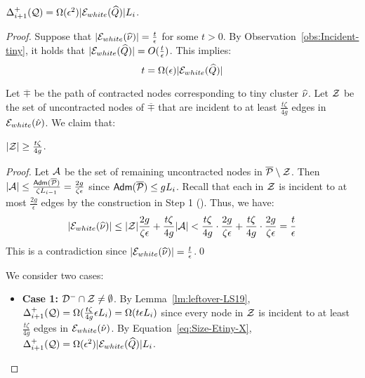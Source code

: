 \begin{lemma}\label{lm:H5}
	$\Delta^+_{i+1}(\mathcal{Q}) = \Omega(\epsilon^2)|\mathcal{E}_{white}(\widehat{Q})|L_i$.
\end{lemma}
\begin{proof}
	Suppose that $|\mathcal{E}_{white}(\widehat{\nu})| = \frac{t}{\epsilon}$ for some $t > 0$. By Observation~\ref{obs:Incident-tiny}, it holds that $|\mathcal{E}_{white}(\widehat{Q})| = O( \frac{t}{\epsilon})$. This implies:
	\begin{equation}\label{eq:Size-Etiny-X}
		t = \Omega(\epsilon)|\mathcal{E}_{white}(\widehat{Q})|
	\end{equation}
	
	Let $\overline{\mp}$ be the path of contracted nodes corresponding to tiny cluster $\widehat{\nu}$. Let $\mathcal{Z}$ be the set of uncontracted nodes of $\overline{\mp}$ that are incident to at least $\frac{t \zeta}{4g}$ edges in $\mathcal{E}_{white}(\hat{\nu})$. We claim that:
	\begin{claim}\label{clm:Size-Z}
		$|\mathcal{Z}|\geq \frac{t\zeta}{4g}$.
	\end{claim}
	\begin{proof}
		Let $\mathcal{A}$ be the set of remaining uncontracted nodes in  $\overline{\mathcal{P}}\setminus \mathcal{Z}$.  Then $|\mathcal{A}|\leq \frac{\mathsf{Adm}(\overline{\mathcal{P}})}{\zeta L_{i-1}} = \frac{2g}{\zeta \epsilon}$ since $\mathsf{Adm}(\overline{\mathcal{P}})\leq gL_i$. Recall that each in $\mathcal{Z}$ is incident to at most $\frac{2g}{\epsilon}$ edges by the construction in Step 1 ().  Thus, we have:
		\begin{equation*}
			|\mathcal{E}_{white}(\widehat{\nu})| \leq |\mathcal{Z}|\frac{2g}{\zeta\epsilon} + \frac{t \zeta}{4g} |\mathcal{A}|  < \frac{t\zeta}{4g} \cdot \frac{2g}{\zeta \epsilon} + \frac{t \zeta}{4g} \cdot \frac{2g}{\zeta \epsilon} = \frac{t}{\epsilon}
		\end{equation*}	
		This is a contradiction since $|\mathcal{E}_{white}(\widehat{\nu})| = \frac{t}{\epsilon}$.\qed
	\end{proof}
	We consider two cases:
	\begin{itemize}
		\item \textbf{Case 1:} $\mathcal{D}^- \cap \mathcal{Z} \not= \emptyset$.  By Lemma~\ref{lm:leftover-LS19}, $\Delta^+_{i+1}(\mathcal{Q}) = \Omega(\frac{t \zeta}{4g} \epsilon L_i) = \Omega(t \epsilon L_i)$ since every node in $\mathcal{Z}$ is incident to at least $\frac{t \zeta}{4g}$ edges in $\mathcal{E}_{white}(\hat{\nu})$. By Equation~\eqref{eq:Size-Etiny-X}, $\Delta^+_{i+1}(\mathcal{Q}) = \Omega(\epsilon^2) |\mathcal{E}_{white}(\widehat{Q})| L_i$.
		

\end{itemize}
\end{proof}
